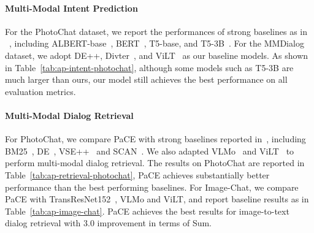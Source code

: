 \documentclass[11pt]{article}
\begin{document}
\paragraph{Multi-Modal Intent Prediction}
For the PhotoChat dataset, we report the performances of strong baselines as in ~\citep{zang2021photochat}, including ALBERT-base~\citep{lan2019albert}, BERT~\citep{devlin2018bert}, T5-base, and T5-3B~\citep{raffel2020exploring}. For the MMDialog dataset, we adopt DE++,  Divter~\citep{feng2022mmdialog}, and ViLT~\citep{kim2021vilt} as our baseline models. As shown in Table~\ref{tab:ap-intent-photochat},
although some models such as T5-3B are much larger than ours, our model still achieves the best performance on all evaluation metrics. 
\begin{table}[t!]
    \centering
    \caption{
    Multi-modal intent prediction results on PhotoChat and MMDialog.
    }
    \label{tab:ap-intent-photochat}
\end{table}



\paragraph{Multi-Modal Dialog Retrieval}
For PhotoChat, we compare PaCE with strong baselines reported in~\citep{zang2021photochat}, including BM25~\citep{robertson2009probabilistic}, 
DE~\citep{zang2021photochat},
VSE++~\citep{faghri2017vse++} and SCAN~\citep{lee2018stacked}. We also adapted VLMo~\citep{bao2021vlmo} and ViLT~\citep{kim2021vilt} to perform multi-modal dialog retrieval.
The results on PhotoChat are reported in Table~\ref{tab:ap-retrieval-photochat}, PaCE achieves substantially better performance than the best performing baselines. 
For Image-Chat, we compare PaCE with TransResNet152~\citep{liao2021mmconv}, VLMo and ViLT, and report baseline results as in Table~\ref{tab:ap-image-chat}. 
PaCE achieves the best results for image-to-text dialog retrieval with 3.0 improvement in terms of Sum.
\end{document}
